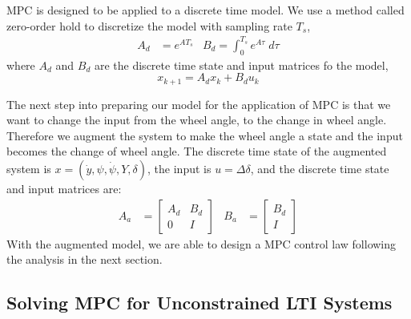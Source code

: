 \documentclass{article}
\begin{document}
MPC is designed to be applied to a discrete time model. We use a method called zero-order hold to discretize the model
with sampling rate $T_s$,
\begin{align}
    A_d &= e^{AT_s} & B_d = \int_0^{T_s}e^{A\tau}\;d\tau
\end{align}
where $A_d$ and $B_d$ are the discrete time state and input matrices fo the model,
\begin{equation}
    x_{k+1} = A_dx_k + B_du_k
\end{equation}

The next step into preparing our model for the application of MPC is that we want to change the input from the wheel
angle, to the change in wheel angle. Therefore we augment the system to make the wheel angle
a state and the input becomes the change of wheel angle. The discrete time state of the augmented system is $x =
(\dot{y}, \psi, \dot{\psi}, Y, \delta)$, the input is $u = \Delta\delta$, and the discrete time state and input
matrices are:
\begin{align}
    A_a &= \begin{bmatrix}
        A_d & B_d \\
        0 & I
    \end{bmatrix} &
    B_a &= \begin{bmatrix}
        B_d \\ I
    \end{bmatrix}
\end{align}
With the augmented model, we are able to design a MPC control law following the analysis in the next section.

\subsection{Solving MPC for Unconstrained LTI Systems}
\end{document}
